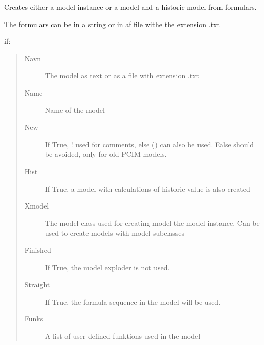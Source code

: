 \documentclass[letterpaper,10pt,english]{sphinxmanual}
\begin{document}
\begin{fulllineitems}
\label{\detokenize{core/modelclass:modelclass.create_model}}
\pysigstartsignatures
{}
\pysigstopsignatures
\sphinxAtStartPar
Creates either a model instance or a model and a historic model from formulars.

\sphinxAtStartPar
The formulars can be in a string or in af file withe the extension .txt

\sphinxAtStartPar
if:
\begin{quote}\begin{description}
\item[{Navn}] \leavevmode
\sphinxAtStartPar
The model as text or as a file with extension .txt

\item[{Name}] \leavevmode
\sphinxAtStartPar
Name of the model

\item[{New}] \leavevmode
\sphinxAtStartPar
If True, ! used for comments, else () can also be used. False should be avoided, only for old PCIM models.

\item[{Hist}] \leavevmode
\sphinxAtStartPar
If True, a model with calculations of historic value is also created

\item[{Xmodel}] \leavevmode
\sphinxAtStartPar
The model class used for creating model the model instance. Can be used to create models with model subclasses

\item[{Finished}] \leavevmode
\sphinxAtStartPar
If True, the model exploder is not used.

\item[{Straight}] \leavevmode
\sphinxAtStartPar
If True, the formula sequence in the model will be used.

\item[{Funks}] \leavevmode
\sphinxAtStartPar
A list of user defined funktions used in the model

\end{description}\end{quote}

\end{fulllineitems}
\end{document}
